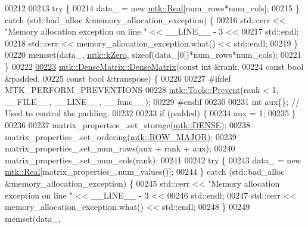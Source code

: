 \begin{DoxyCode}
00212 
00213   \textcolor{keywordflow}{try} \{
00214     data\_ = \textcolor{keyword}{new} \hyperlink{group__c01-roots_gac080bbbf5cbb5502c9f00405f894857d}{mtk::Real}[num\_rows*num\_cols];
00215   \} \textcolor{keywordflow}{catch} (std::bad\_alloc &memory\_allocation\_exception) \{
00216     std::cerr << \textcolor{stringliteral}{"Memory allocation exception on line "} << \_\_LINE\_\_ - 3 <<
00217       std::endl;
00218     std::cerr << memory\_allocation\_exception.what() << std::endl;
00219   \}
00220   memset(data\_, \hyperlink{group__c01-roots_ga59a451a5fae30d59649bcda274fea271}{mtk::kZero}, \textcolor{keyword}{sizeof}(data\_[0])*num\_rows*num\_cols);
00221 \}
00222 
\hypertarget{mtk__dense__matrix_8cc_source_l00223}{}\hyperlink{classmtk_1_1DenseMatrix_a4ef0dec1b5558fcf00719bfac059ec68}{00223} \hyperlink{classmtk_1_1DenseMatrix_a0c75ee704707983f935b02835eab0933}{mtk::DenseMatrix::DenseMatrix}(\textcolor{keyword}{const} \textcolor{keywordtype}{int} &rank,
00224                               \textcolor{keyword}{const} \textcolor{keywordtype}{bool} &padded,
00225                               \textcolor{keyword}{const} \textcolor{keywordtype}{bool} &transpose) \{
00226 
00227 \textcolor{preprocessor}{  #ifdef MTK\_PERFORM\_PREVENTIONS}
00228   \hyperlink{classmtk_1_1Tools_a332324c6f25e66be9dff48c5987a3b9f}{mtk::Tools::Prevent}(rank < 1, \_\_FILE\_\_, \_\_LINE\_\_, \_\_func\_\_);
00229 \textcolor{preprocessor}{  #endif}
00230 
00231   \textcolor{keywordtype}{int} aux\{\};  \textcolor{comment}{// Used to control the padding.}
00232 
00233   \textcolor{keywordflow}{if} (padded) \{
00234     aux = 1;
00235   \}
00236 
00237   matrix\_properties\_.set\_storage(\hyperlink{namespacemtk_ga25b67ec6a2afeee69f9bb196a9c66619a00a806d43a7d74e9ccca47a2134e9c87}{mtk::DENSE});
00238   matrix\_properties\_.set\_ordering(\hyperlink{namespacemtk_ga622801bd9f912d0f976c3e383f5f581cabc55178ac16eb1ce89b5f3ab915a91f3}{mtk::ROW\_MAJOR});
00239   matrix\_properties\_.set\_num\_rows(aux + rank + aux);
00240   matrix\_properties\_.set\_num\_cols(rank);
00241 
00242   \textcolor{keywordflow}{try} \{
00243     data\_ = \textcolor{keyword}{new} \hyperlink{group__c01-roots_gac080bbbf5cbb5502c9f00405f894857d}{mtk::Real}[matrix\_properties\_.num\_values()];
00244   \} \textcolor{keywordflow}{catch} (std::bad\_alloc &memory\_allocation\_exception) \{
00245     std::cerr << \textcolor{stringliteral}{"Memory allocation exception on line "} << \_\_LINE\_\_ - 3 <<
00246       std::endl;
00247     std::cerr << memory\_allocation\_exception.what() << std::endl;
00248   \}
00249   memset(data\_,

\end{DoxyCode}

